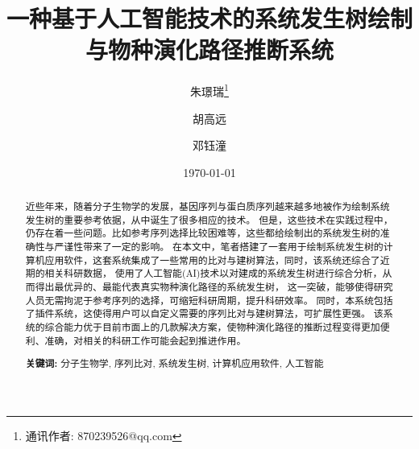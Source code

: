 \documentclass{article}
\begin{document}
\title{一种基于人工智能技术的系统发生树绘制与物种演化路径推断系统}
\author[a]{朱璟瑞\thanks{通讯作者: 870239526@qq.com}}
\author[a]{胡高远}
\author[a]{邓钰潼}
\date{\today}
\maketitle

\begin{abstract}
    \par
    近些年来，随着分子生物学的发展，基因序列与蛋白质序列越来越多地被作为绘制系统发生树的重要参考依据，从中诞生了很多相应的技术。
    但是，这些技术在实践过程中，仍存在着一些问题。比如参考序列选择比较困难等，这些都给绘制出的系统发生树的准确性与严谨性带来了一定的影响。
    在本文中，笔者搭建了一套用于绘制系统发生树的计算机应用软件，这套系统集成了一些常用的比对与建树算法，同时，该系统还综合了近期的相关科研数据，
    使用了人工智能(AI)技术以对建成的系统发生树进行综合分析，从而得出最优异的、最能代表真实物种演化路径的系统发生树，
    这一突破，能够使得研究人员无需拘泥于参考序列的选择，可缩短科研周期，提升科研效率。
    同时，本系统包括了插件系统，这使得用户可以自定义需要的序列比对与建树算法，可扩展性更强。
    该系统的综合能力优于目前市面上的几款解决方案，使物种演化路径的推断过程变得更加便利、准确，对相关的科研工作可能会起到推进作用。
    \par\textbf{关键词: } 分子生物学, 序列比对, 系统发生树, 计算机应用软件, 人工智能
\end{abstract}

\tableofcontents
\newpage
{}
\end{document}
